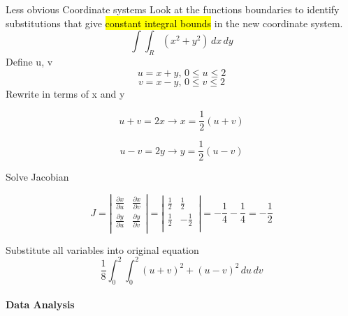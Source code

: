 \documentclass[
  ignorenonframetext,
]{beamer}
\begin{document}
\begin{frame}{Less obvious Coordinate systems}
\protect\hypertarget{less-obvious-coordinate-systems}{}
Look at the functions boundaries to identify substitutions that give
\hl{constant integral bounds} in the new coordinate system.\\
{\[\int\int_{R}(x^{2} + y^{2})\, dx\, dy\]}Define u, v\\
{\[u = x + y,\, 0 \leq u \leq 2\]}{\[v = x - y,\, 0 \leq v \leq 2\]}Rewrite
in terms of x and y

\[u + v = 2x \rightarrow x = \frac{1}{2}(u + v)\]

\[u - v = 2y \rightarrow y = \frac{1}{2}(u - v)\]

Solve Jacobian

\[J = \left| \begin{matrix}
\frac{\partial x}{\partial u} & \frac{\partial x}{\partial v} \\
\frac{\partial y}{\partial u} & \frac{\partial y}{\partial v} \\
\end{matrix} \right| = \left| \begin{matrix}
\frac{1}{2} & \frac{1}{2} \\
\frac{1}{2} & {- \frac{1}{2}\,} \\
\end{matrix} \right| = - \frac{1}{4} - \frac{1}{4} = - \frac{1}{2}\]

Substitute all variables into original equation\\
{\[\frac{1}{8}\int_{0}^{2}\int_{0}^{2}(u + v)^{2} + (u - v)^{2}\, du\, dv\]}
\end{frame}

\hypertarget{data-analysis}{%
\paragraph{Data Analysis}\label{data-analysis}}
\end{document}
